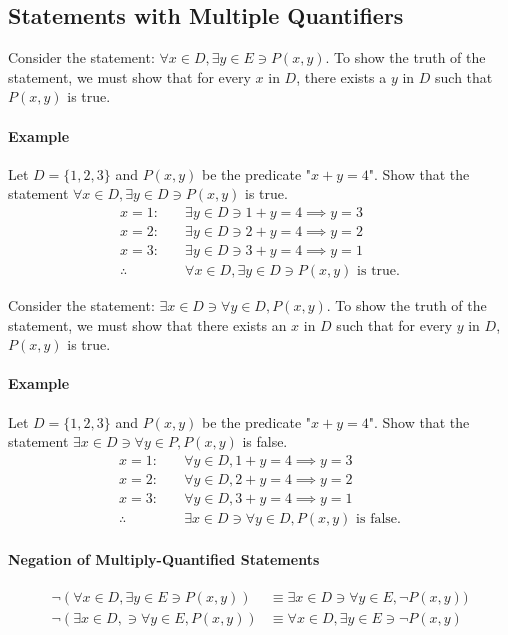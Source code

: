 \subsection{Statements with Multiple Quantifiers}
\hrulefill

Consider the statement: $\forall x \in D, \exists y \in E \ni P(x,y)$. To show the truth of the statement, 
we must show that for every $x$ in $D$, there exists a $y$ in $D$ such that $P(x,y)$ is true.

\paragraph*{Example}
Let $D = \{1,2,3\}$ and $P(x,y)$ be the predicate "$x + y = 4$". Show that the statement
$\forall x \in D, \exists y \in D \ni P(x,y)$ is true.
\begin{align*}
    x = 1: \quad &\exists y \in D \ni 1 + y = 4 \implies y = 3\\
    x = 2: \quad &\exists y \in D \ni 2 + y = 4 \implies y = 2\\
    x = 3: \quad &\exists y \in D \ni 3 + y = 4 \implies y = 1\\
    \therefore \quad &\forall x \in D, \exists y \in D \ni P(x,y) \text{ is true.}
\end{align*}

Consider the statement: $\exists x \in D \ni \forall y \in D, P(x,y)$. To show the truth of the statement,
we must show that there exists an $x$ in $D$ such that for every $y$ in $D$, $P(x,y)$ is true.

\paragraph*{Example}
Let $D = \{1,2,3\}$ and $P(x,y)$ be the predicate "$x + y = 4$". Show that the statement
$\exists x \in D \ni \forall y \in P, P(x,y)$ is false.
\begin{align*}
    x = 1: \quad &\forall y \in D, 1 + y = 4 \implies y = 3\\
    x = 2: \quad &\forall y \in D, 2 + y = 4 \implies y = 2\\
    x = 3: \quad &\forall y \in D, 3 + y = 4 \implies y = 1\\
    \therefore \quad &\exists x \in D \ni \forall y \in D, P(x,y) \text{ is false.}
\end{align*}

\paragraph*{Negation of Multiply-Quantified Statements}
\begin{align*}
    \neg(\forall x \in D, \exists y \in E \ni P(x,y)) &\equiv \exists x \in D \ni \forall y \in E, \neg P(x,y))\\
    \neg(\exists x \in D, \ni \forall y \in E, P(x,y)) &\equiv \forall x \in D, \exists y \in E \ni \neg P(x,y)\\
\end{align*}

